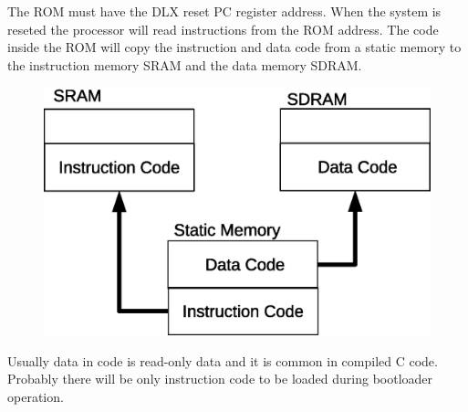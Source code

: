 \documentclass{article}
\begin{document}
  The ROM must have the DLX reset PC register address. When the system is reseted the processor will read instructions from the ROM address. The code inside the ROM will copy the instruction and data code from a static memory to the instruction memory SRAM and the data memory SDRAM.

  \begin{figure}[H]
    \centering
    \includegraphics[width=.7\linewidth]{pictures/bootloader.eps}
  \end{figure}  
  
  Usually data in code is read-only data and it is common in compiled C code. Probably there will be only instruction code to be loaded during bootloader operation.

    
% 
% 
\end{document}
